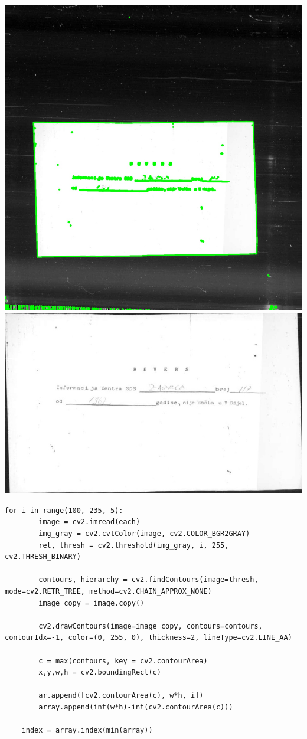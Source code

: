 \documentclass{article}
\begin{document}
\begin{center}
    \includegraphics[scale=0.15]{image_contour.jpg}
    \includegraphics[scale=0.22]{Z05353721-cont.jpg}
\end{center}
\newpage
\begin{lstlisting}
for i in range(100, 235, 5):
        image = cv2.imread(each)
        img_gray = cv2.cvtColor(image, cv2.COLOR_BGR2GRAY)
        ret, thresh = cv2.threshold(img_gray, i, 255, cv2.THRESH_BINARY)

        contours, hierarchy = cv2.findContours(image=thresh, mode=cv2.RETR_TREE, method=cv2.CHAIN_APPROX_NONE)
        image_copy = image.copy()

        cv2.drawContours(image=image_copy, contours=contours, contourIdx=-1, color=(0, 255, 0), thickness=2, lineType=cv2.LINE_AA)

        c = max(contours, key = cv2.contourArea)
        x,y,w,h = cv2.boundingRect(c)

        ar.append([cv2.contourArea(c), w*h, i])
        array.append(int(w*h)-int(cv2.contourArea(c)))

    index = array.index(min(array))
\end{lstlisting}
\end{document}
